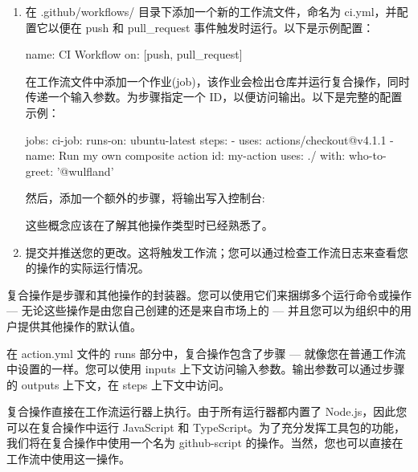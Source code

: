 \begin{enumerate}
\item 
在 .github/workflows/ 目录下添加一个新的工作流文件，命名为 ci.yml，并配置它以便在 push 和 pull\_request 事件触发时运行。以下是示例配置：

\begin{shell}
name: CI Workflow
on: [push, pull_request]
\end{shell}

在工作流文件中添加一个作业(job)，该作业会检出仓库并运行复合操作，同时传递一个输入参数。为步骤指定一个 ID，以便访问输出。以下是完整的配置示例：

\begin{shell}
jobs:
  ci-job:
    runs-on: ubuntu-latest
    steps:
      - uses: actions/checkout@v4.1.1
      - name: Run my own composite action
        id: my-action
        uses: ./
        with:
          who-to-greet: '@wulfland'
\end{shell}

然后，添加一个额外的步骤，将输出写入控制台:


这些概念应该在了解其他操作类型时已经熟悉了。

\item 
提交并推送您的更改。这将触发工作流；您可以通过检查工作流日志来查看您的操作的实际运行情况。
\end{enumerate}


复合操作是步骤和其他操作的封装器。您可以使用它们来捆绑多个运行命令或操作 --- 无论这些操作是由您自己创建的还是来自市场上的 --- 并且您可以为组织中的用户提供其他操作的默认值。

在 action.yml 文件的 runs 部分中，复合操作包含了步骤 --- 就像您在普通工作流中设置的一样。您可以使用 inputs 上下文访问输入参数。输出参数可以通过步骤的 outputs 上下文，在 steps 上下文中访问。


复合操作直接在工作流运行器上执行。由于所有运行器都内置了 Node.js，因此您可以在复合操作中运行 JavaScript 和 TypeScript。为了充分发挥工具包的功能，我们将在复合操作中使用一个名为 github-script 的操作。当然，您也可以直接在工作流中使用这一操作。
